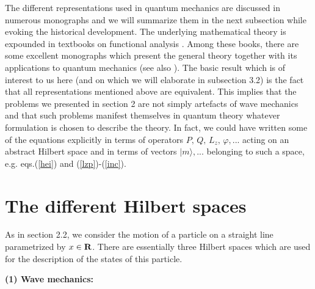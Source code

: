 \documentclass[a4wide,12pt]{report}
\begin{document}
 The different representations used in quantum mechanics are
 discussed in numerous monographs \cite{ct} and we will 
 summarize them in the next subsection 
while evoking the historical  development. 
 The underlying mathematical theory is expounded in textbooks
 on functional analysis  \cite{af}. Among these books, there are some
 excellent monographs which present the general theory together with its
 applications to quantum mechanics
 \cite{rs,sg,bgc} (see also \cite{ri,lio,tj,krey}).
The basic result which is of interest to us here
(and on which we will elaborate in subsection 3.2)
is the fact that all representations mentioned above 
are equivalent. 
This implies that the problems we presented 
in section 2 are not simply artefacts of wave mechanics
and that such problems manifest themselves 
 in quantum theory  
whatever formulation is chosen to describe the theory. 
In fact, we could have written some of the 
equations  explicitly in terms of operators 
$P, \, Q, \, L_z, \, \varphi , ...$
acting  on an abstract Hilbert space and 
in terms of vectors 
$| m \rangle ,...$ belonging to such a space, e.g. eqs.(\ref{hei})
and  (\ref{lzp})-(\ref{inc}). 


   
   \section{The different Hilbert spaces}

As in section 2.2, we consider the motion of a particle 
on a straight line parametrized by 
$x \in {\bf R}$. 
There are essentially three Hilbert spaces which
are used for the description of the states  of this 
particle.
 
\bigskip
 
\noindent
{\bf (1) Wave mechanics:} 

\medskip 
\end{document}
